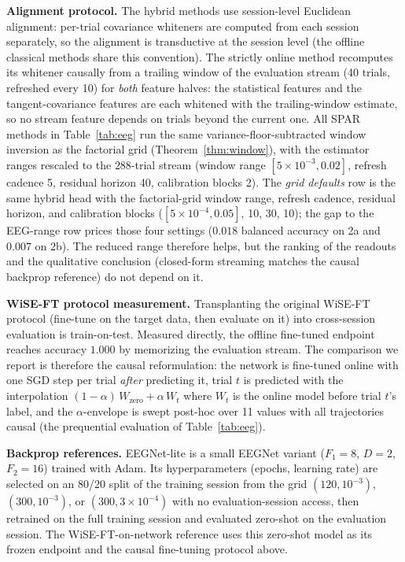 \textbf{Alignment protocol.}
The hybrid methods use session-level Euclidean alignment: per-trial covariance whiteners are computed from each session separately, so the alignment is transductive at the session level (the offline classical methods share this convention).
The strictly online method recomputes its whitener causally from a trailing window of the evaluation stream (40 trials, refreshed every 10) for \emph{both} feature halves: the statistical features and the tangent-covariance features are each whitened with the trailing-window estimate, so no stream feature depends on trials beyond the current one.
All SPAR methods in Table~\ref{tab:eeg} run the same variance-floor-subtracted window inversion as the factorial grid (Theorem~\ref{thm:window}), with the estimator ranges rescaled to the $288$-trial stream (window range $[5\times10^{-3},0.02]$, refresh cadence 5, residual horizon 40, calibration blocks 2).
The \emph{grid defaults} row is the same hybrid head with the factorial-grid window range, refresh cadence, residual horizon, and calibration blocks ($[5\times10^{-4},0.05]$, 10, 30, 10); the gap to the EEG-range row prices those four settings ($0.018$ balanced accuracy on 2a and $0.007$ on 2b).
The reduced range therefore helps, but the ranking of the readouts and the qualitative conclusion (closed-form streaming matches the causal backprop reference) do not depend on it.

\textbf{WiSE-FT protocol measurement.}
Transplanting the original WiSE-FT protocol \citep{wortsman2022wiseft} (fine-tune on the target data, then evaluate on it) into cross-session evaluation is train-on-test.
Measured directly, the offline fine-tuned endpoint reaches accuracy $1.000$ by memorizing the evaluation stream.
The comparison we report is therefore the causal reformulation: the network is fine-tuned online with one SGD step per trial \emph{after} predicting it, trial $t$ is predicted with the interpolation $(1 - \alpha)\,W_{\mathrm{zero}} + \alpha\,W_t$ where $W_t$ is the online model before trial $t$'s label, and the $\alpha$-envelope is swept post-hoc over 11 values with all trajectories causal (the prequential evaluation of Table~\ref{tab:eeg}).

\textbf{Backprop references.}
EEGNet-lite is a small EEGNet variant \citep{lawhern2018eegnet} ($F_1 = 8$, $D = 2$, $F_2 = 16$) trained with Adam.
Its hyperparameters (epochs, learning rate) are selected on an 80/20 split of the training session from the grid $(120, 10^{-3})$, $(300, 10^{-3})$, or $(300, 3 \times 10^{-4})$ with no evaluation-session access, then retrained on the full training session and evaluated zero-shot on the evaluation session.
The WiSE-FT-on-network reference uses this zero-shot model as its frozen endpoint and the causal fine-tuning protocol above.


